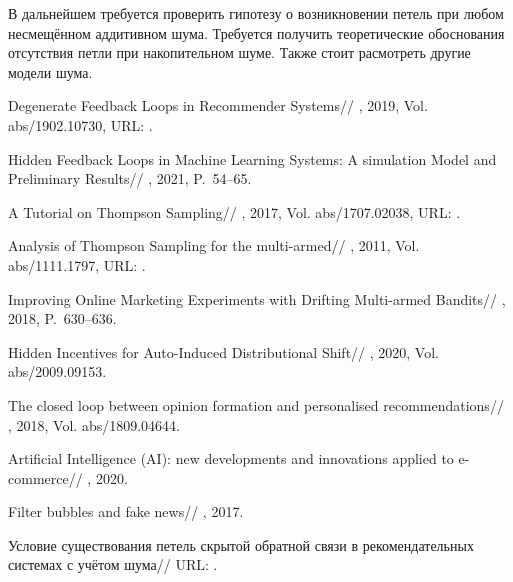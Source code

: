 \documentclass[12pt, twoside]{article}
\begin{document}
В дальнейшем требуется проверить гипотезу о возникновении петель при любом несмещённом аддитивном шума. 
Требуется получить теоретические обоснования отсутствия петли при накопительном шуме.
Также стоит расмотреть другие модели шума. 
\begin{thebibliography}{99}
    Degenerate Feedback Loops in Recommender Systems//
    , 2019, Vol. abs/1902.10730,
	  URL: .

    Hidden Feedback Loops in Machine Learning Systems: A simulation Model and Preliminary Results//
    , 2021, P.~54--65.

    A Tutorial on Thompson Sampling//
    , 2017, Vol. abs/1707.02038,
	  URL: .

    Analysis of Thompson Sampling for the multi-armed//
    , 2011, Vol. abs/1111.1797,
	  URL: .

    Improving Online Marketing Experiments with Drifting Multi-armed Bandits//
    , 2018, P.~630--636.

    Hidden Incentives for Auto-Induced Distributional Shift//
    , 2020, Vol. abs/2009.09153.

    The closed loop between opinion formation and personalised recommendations//
    , 2018, Vol. abs/1809.04644.

    Artificial Intelligence (AI): new developments and innovations applied to e-commerce//
    , 2020.

    Filter bubbles and fake news//
    , 2017.

    Условие существования петель скрытой обратной связи в рекомендательных системах с учётом шума//
	  URL: .
\end{thebibliography}
\end{document}
